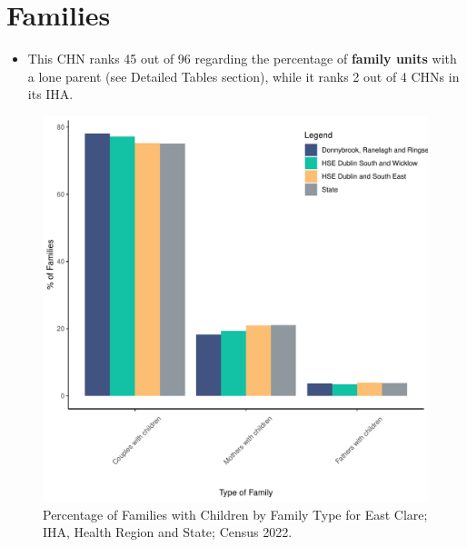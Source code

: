 \documentclass{article}
\begin{document}
\section{Families}\label{sect:Fam}
\begin{itemize}
\item This CHN ranks  45 out of 96 regarding the percentage of \textbf{family units} with a lone parent (see Detailed Tables section), while it ranks   2 out of 4 CHNs in its IHA.
\end{itemize}
\begin{figure}[H]
	\centering
	\includegraphics[width = 150mm]{../figures/FamED.pdf}
	\caption{Percentage of Families with Children by Family Type for East Clare; IHA, Health Region and State; Census 2022.}
	\label{fig:vbnv}
	\end{figure}
	
\end{document}

